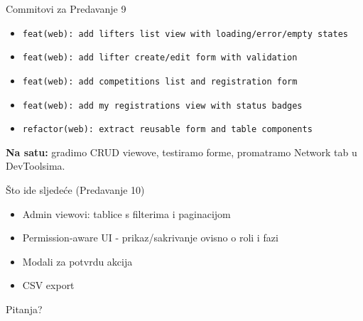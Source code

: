 \begin{frame}{Commitovi za Predavanje 9}
\begin{itemize}
  \item \texttt{feat(web): add lifters list view with loading/error/empty states}
  \item \texttt{feat(web): add lifter create/edit form with validation}
  \item \texttt{feat(web): add competitions list and registration form}
  \item \texttt{feat(web): add my registrations view with status badges}
  \item \texttt{refactor(web): extract reusable form and table components}
\end{itemize}

\vspace{0.4em}
\textbf{Na satu:} gradimo CRUD viewove, testiramo forme, promatramo Network tab u DevToolsima.
\end{frame}

\begin{frame}{Što ide sljedeće (Predavanje 10)}
\begin{itemize}
  \item Admin viewovi: tablice s filterima i paginacijom
  \item Permission-aware UI - prikaz/sakrivanje ovisno o roli i fazi
  \item Modali za potvrdu akcija
  \item CSV export
\end{itemize}

\vspace{0.8em}
\begin{center}
\Large Pitanja?
\end{center}
\end{frame}


